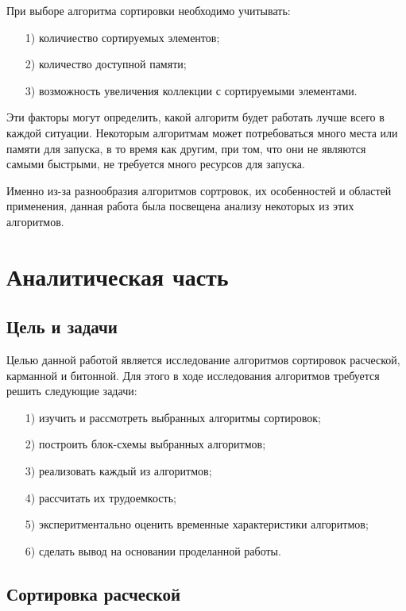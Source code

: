 \documentclass[12pt]{report}
\begin{document}
При выборе алгоритма сортировки необходимо учитывать: 
\begin{enumerate}
	\item[1)] количиество сортируемых элементов;
	\item[2)] количество доступной памяти;
	\item[3)] возможность увеличения коллекции с сортируемыми элементами.
\end{enumerate}
  

Эти факторы могут определить, какой алгоритм будет работать лучше всего в каждой ситуации. Некоторым алгоритмам может потребоваться много места или памяти для запуска, в то время как другим, при том, что они не являются самыми быстрыми, не требуется много ресурсов для запуска.

Именно из-за разнообразия алгоритмов сортровок, их особенностей и областей применения, данная работа была посвещена анализу некоторых из этих алгоритмов.
	
	
	

	
	\chapter{Аналитическая часть}
	
	\section{Цель и задачи}
	
	Целью данной работой является исследование алгоритмов сортировок расческой, карманной и битонной. Для этого в ходе исследования алгоритмов требуется решить следующие задачи:
	\begin{enumerate}
		\item[1)] изучить и рассмотреть выбранных алгоритмы сортировок;
		\item[2)] построить блок-схемы выбранных алгоритмов;
		\item[3)] реализовать каждый из алгоритмов;
		\item[4)] рассчитать их трудоемкость;
		\item[5)] эксперитментально оценить временные характеристики алгоритмов;
		\item[6)] сделать вывод на основании проделанной работы.
	\end{enumerate}
	
	
	\section{Сортировка расческой}
	
\end{document}
